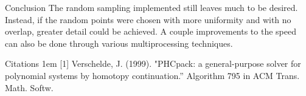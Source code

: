 \documentclass{beamer}
\begin{document}
\begin{frame}{}
\begin{columns}[t]
\begin{column}{0.32\linewidth}
\begin{block}{Conclusion}
The random sampling implemented still leaves much to be desired. Instead, if the random points were chosen with more uniformity and with no overlap, greater detail could be achieved. A couple improvements to the speed can also be done through various multiprocessing techniques. 
\end{block}
\begin{block}{Citations}
\hangindent1em
[1] Verschelde, J. (1999). "PHCpack: a general-purpose solver for polynomial systems by homotopy continuation.'' Algorithm 795 in  ACM Trans. Math. Softw. 
\\


\end{block}

\end{column}%

\end{columns}
\end{frame}
\end{document}
